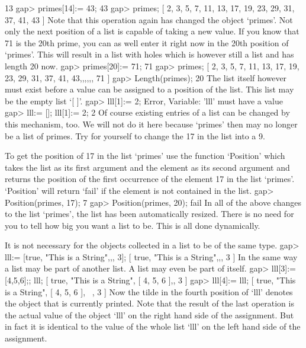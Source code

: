     13
    gap> primes[14]:= 43;
    43
    gap> primes;
    [ 2, 3, 5, 7, 11, 13, 17, 19, 23, 29, 31, 37, 41, 43 ] 
\endexample
Note that this operation again has changed the object `primes'.  Not only
the next position of a list is capable  of taking  a  new  value.  If you
know that 71 is the 20th prime, you can as well enter it right now in the
20th position of `primes'.   This  will result in a list with holes which
is however still a list and has length 20 now.
\beginexample
    gap> primes[20]:= 71;
    71
    gap> primes;
    [ 2, 3, 5, 7, 11, 13, 17, 19, 23, 29, 31, 37, 41, 43,,,,,, 71 ]
    gap> Length(primes);
    20 
\endexample
The list itself however must  exist before a  value can be  assigned to a
position of the list.  This list may be the empty list `[ ]'.
\beginexample
    gap> lll[1]:= 2;
    Error, Variable: 'lll' must have a value
    gap> lll:= []; lll[1]:= 2;
    2 
\endexample
Of course  existing entries of a list  can be  changed by this mechanism,
too. We will not do it here because `primes' then may no longer be a list
of primes. Try for yourself to change the 17 in the list into a 9.

To get the position    of 17 in  the   list  `primes' use   the  function
`Position' which takes the list as its  first argument and the element as
its second argument  and returns the position of  the first occurrence of
the element 17 in the list `primes'. `Position' will return `fail' if the
element is not contained in the list.
\beginexample
    gap> Position(primes, 17);
    7
    gap> Position(primes, 20);
    fail
\endexample
In  all  of the  above changes to  the  list `primes',  the list has been
automatically resized.  There  is no need  for you to tell {\GAP} how big
you want a list to be.  This is all done dynamically.

It is not necessary for the objects collected in a list to be of the same
type.
\beginexample
    gap> lll:= [true, "This is a String",,, 3];
    [ true, "This is a String",,, 3 ] 
\endexample
In the same way a list may be part of another  list.  A list  may even be
part of itself.
\beginexample
    gap> lll[3]:= [4,5,6];; lll;
    [ true, "This is a String", [ 4, 5, 6 ],, 3 ]
    gap> lll[4]:= lll;
    [ true, "This is a String", [ 4, 5, 6 ], ~, 3 ] 
\endexample
Now the tilde in the fourth position of `lll'  denotes the object that is
currently  printed. Note that  the result  of the  last operation is  the
actual value  of  the  object  `lll'   on  the  right  hand side  of  the
assignment. But in  fact it is  identical to the value  of the whole list
`lll' on the left hand side of the assignment.

